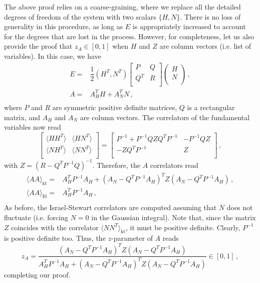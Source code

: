 \documentclass[aps,prd,preprint,nofootinbib,amsmath,amssymb,showpacs,longbibliography,singlecolumn,superscriptaddress,10pt]{revtex4-1}
\theoremstyle{plain}
\theoremstyle{definition}
\begin{document}
The above proof relies on a coarse-graining, where we replace all the detailed degrees of freedom of the system with two scalars $\{H,N\}$. There is no loss of generality in this procedure, as long as $E$ is appropriately increased to account for the degrees that are lost in the process. However, for completeness, let us also provide the proof that $z_A \in[0,1]$ when $H$ and $Z$ are column vectors (i.e. list of variables). In this case, we have
\begin{equation}\label{Eooohohoh2}
\begin{split}
    E ={}& \dfrac{1}{2} (H^T,N^T) 
    \begin{bmatrix}
        P & Q \\
        Q^T & R \\
    \end{bmatrix} 
    \begin{pmatrix}
        H \\
        N \\
    \end{pmatrix} \, , \\
    A={}& A_H^T H + A_N^T N \, , \\
\end{split}
\end{equation}
where $P$ and $R$ are symmetric positive definite matrices, $Q$ is a rectangular matrix, and $A_H$ and $A_N$ are column vectors. The correlators of the fundamental variables now read
\begin{equation}
     \begin{bmatrix}
        \langle HH^T \rangle & \langle HN^T \rangle \\
        \langle NH^T \rangle & \langle NN^T \rangle \\
    \end{bmatrix} =   
\begin{bmatrix}
    P^{-1}+P^{-1}QZQ^T P^{-1} & -P^{-1}QZ \\
    -ZQ^T P^{-1} & Z \\
\end{bmatrix} \, ,
\end{equation}
with $Z=(R{-}Q^T P^{-1}Q)^{-1}$. Therefore, the $A$ correlators read
\begin{equation}
\begin{split}
\langle AA\rangle_{\text{kt}}={}& A_H^T P^{-1} A_H + (A_N{-}Q^T P^{-1} A_H)^T Z (A_N{-}Q^T P^{-1} A_H) \, , \\
\langle AA\rangle_{\text{IS}}={}& A_H^T P^{-1} A_H \, , \\
\end{split}
\end{equation}
As before, the Israel-Stewart correlators are computed assuming that $N$ does not fluctuate (i.e. forcing $N=0$ in the Gaussian integral). Note that, since the matrix $Z$ coincides with the correlator $\langle N N^T \rangle_{\text{kt}}$, it must be positive definite. Clearly, $P^{-1}$ is positive definite too. Thus, the $z$-parameter of $A$ reads
\begin{equation}
    z_A = \dfrac{(A_N{-}Q^T P^{-1} A_H)^T Z (A_N{-}Q^T P^{-1} A_H) }{A_H^T P^{-1} A_H + (A_N{-}Q^T P^{-1} A_H)^T Z (A_N{-}Q^T P^{-1} A_H) } \in [0,1] \, ,
\end{equation}
completing our proof.
\end{document}
